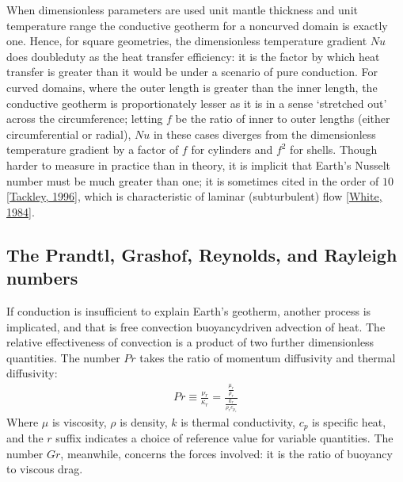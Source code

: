 \documentclass[letterpaper,10pt,english]{jupyterBook}
\begin{document}
\sphinxAtStartPar
When dimensionless parameters are used \sphinxhyphen{} unit mantle thickness and unit temperature range \sphinxhyphen{} the conductive geotherm for a non\sphinxhyphen{}curved domain is exactly one. Hence, for square geometries, the dimensionless temperature gradient \(Nu\) does double\sphinxhyphen{}duty as the heat transfer efficiency: it is the factor by which heat transfer is greater than it would be under a scenario of pure conduction. For curved domains, where the outer length is greater than the inner length, the conductive geotherm is proportionately lesser as it is in a sense ‘stretched out’ across the circumference; letting \(f\) be the ratio of inner to outer lengths (either circumferential or radial), \(Nu\) in these cases diverges from the dimensionless temperature gradient by a factor of \(f\) for cylinders and \(f^2\) for shells. Though harder to measure in practice than in theory, it is implicit that Earth’s Nusselt number must be much greater than one; it is sometimes cited in the order of \(10\) {[}\hyperlink{cite.references:id662}{Tackley, 1996}{]}, which is characteristic of laminar (sub\sphinxhyphen{}turbulent) flow {[}\hyperlink{cite.references:id666}{White, 1984}{]}.


\subsection{The Prandtl, Grashof, Reynolds, and Rayleigh numbers}
\label{\detokenize{content/chapter_02_methods/section1:the-prandtl-grashof-reynolds-and-rayleigh-numbers}}
\sphinxAtStartPar
If conduction is insufficient to explain Earth’s geotherm, another process is implicated, and that is free convection \sphinxhyphen{} buoyancy\sphinxhyphen{}driven advection of heat. The relative effectiveness of convection is a product of two further dimensionless quantities. The  number \(Pr\) takes the ratio of momentum diffusivity and thermal diffusivity:
\begin{equation*}
\begin{split} Pr \equiv \frac{\nu_r}{\kappa_r} = \frac{\frac{\mu_r}{\rho_r}}{\frac{k_r}{\rho_r c_{p_r}}} \end{split}
\end{equation*}
\sphinxAtStartPar
Where \(\mu\) is viscosity, \(\rho\) is density, \(k\) is thermal conductivity, \(c_p\) is specific heat, and the \(r\) suffix indicates a choice of reference value for variable quantities. The  number \(Gr\), meanwhile, concerns the forces involved: it is the ratio of buoyancy to viscous drag.
\end{document}
